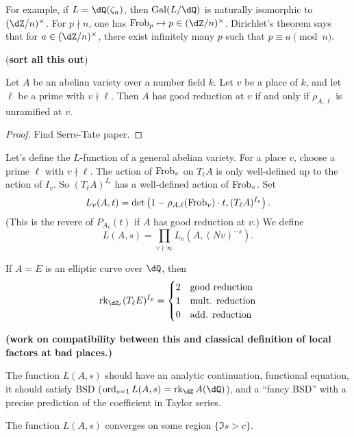 For example, if $L=\dQ(\zeta_n)$, then $\gal(L/\dQ)$ is naturally isomorphic to 
$(\dZ/n)^\times$. For $p\nmid n$, one has $\frob_p \mapsto p\in (\dZ/n)^\times$. 
Dirichlet's theorem says that for $a\in (\dZ/n)^\times$, there exist infinitely 
many $p$ such that $p\equiv a\pmod n$. 

(\textbf{sort all this out})

\begin{theorem}
Let $A$ be an abelian variety over a number field $k$. Let $v$ be a place of 
$k$, and let $\ell$ be a prime with $v\nmid \ell$. Then $A$ has good reduction 
at $v$ if and only if $\rho_{A,\ell}$ is unramified at $v$. 
\end{theorem}
\begin{proof}
Find Serre-Tate paper.
\end{proof}

Let's define the $L$-function of a general abelian variety. For a place $v$, 
choose a prime $\ell$ with $v\nmid \ell$. The action of 
$\mathrm{Frob}_v$ on $T_\ell A$ is only well-defined up to the action of 
$I_v$. So $(T_\ell A)^{I_v}$ has a well-defined action of $\mathrm{Frob}_v$. Set 
\[
  L_v(A,t) = \det\left(1-\rho_{A,\ell}(\mathrm{Frob}_v)\cdot t,(T_\ell A)^{I_v}\right) \text{.}
\]
(This is the revere of $P_{A_v}(t)$ if $A$ has good reduction at $v$.) We define 
\[
  L(A,s) = \prod_{v\nmid \infty} L_v(A,(N v)^{-s}) \text{.}
\]

If $A=E$ is an elliptic curve over $\dQ$, then 
\[
  \rank_{\dZ_\ell} (T_\ell E)^{I_p}
  =
  \begin{cases}
    2 & \text{good reduction} \\
    1 & \text{mult. reduction} \\
    0 & \text{add. reduction}
  \end{cases}
\]

\textbf{(work on compatibility between this and classical definition of 
local factors at bad places.)}

The function $L(A,s)$ should have an analytic continuation, functional equation, 
it should satisfy BSD ($\ord_{s=1} L(A,s) = \rank_\dZ A(\dQ)$), and a ``fancy BSD'' 
with a precise prediction of the coefficient in Taylor series. 

The function $L(A,s)$ converges on some region $\{\Im s>c\}$. 









